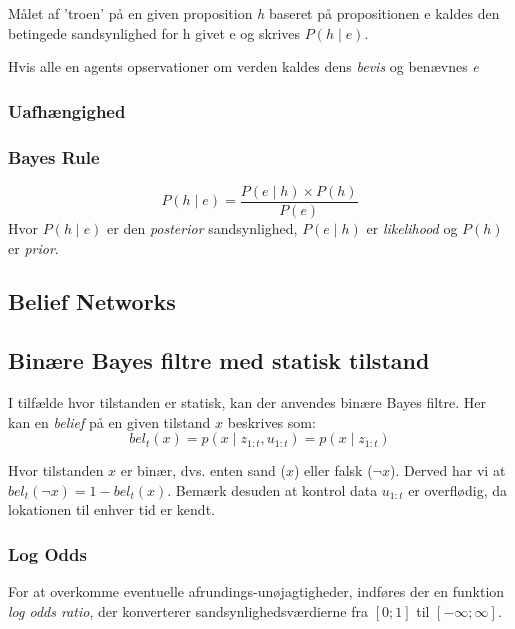 Målet af 'troen' på en given proposition \emph{h} baseret på propositionen e kaldes
den betingede sandsynlighed for h givet e og skrives $P(h \mid e)$.

Hvis alle en agents opservationer om verden kaldes dens \emph{bevis} og benævnes \emph{e}




\subsubsection{Uafhængighed}



\subsubsection{Bayes Rule}

$$P(h \mid e) = \frac{P(e \mid h) \times P(h)}{P(e)}$$
Hvor $P(h \mid e)$ er den \emph{posterior} sandsynlighed, $P(e \mid h)$ er \emph{likelihood} og $P(h)$ er \emph{prior}. 


\subsection{Belief Networks}







\subsection{Binære Bayes filtre med statisk tilstand}
I tilfælde hvor tilstanden er statisk, kan der anvendes binære Bayes filtre.
Her kan en \textit{belief} på en given tilstand $x$ beskrives som:
\begin{equation}
bel_t(x) = p(x \mid z_{1:t},u_{1:t}) = p(x \mid z_{1:t})
\end{equation}

Hvor tilstanden $x$ er binær, dvs. enten sand ($x$) eller falsk ($\lnot x$).
Derved har vi at $bel_t(\lnot x) = 1 - bel_t(x)$.
Bemærk desuden at kontrol data $u_{1:t}$ er overflødig, da lokationen til enhver tid er kendt.

\subsubsection{Log Odds}
For at overkomme eventuelle afrundings-unøjagtigheder, indføres der en funktion \textit{log odds ratio}, der konverterer sandsynlighedsværdierne fra $[0;1]$ til $[-\infty;\infty]$.

